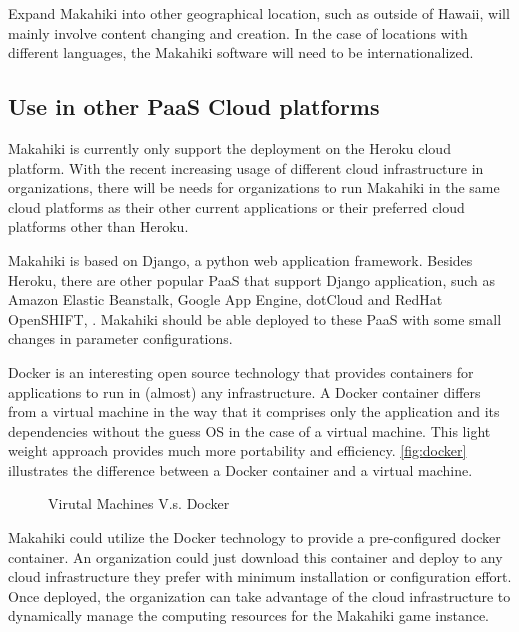 Expand Makahiki into other geographical location, such as outside of Hawaii, will mainly involve content changing and creation. In the case of locations with different languages, the Makahiki software will need to be internationalized. 

\subsection{Use in other PaaS Cloud platforms}
Makahiki is currently only support the deployment on the Heroku cloud platform. With the recent increasing usage of different cloud infrastructure in organizations, there will be needs for organizations to run Makahiki in the same cloud platforms as their other current  applications or their preferred cloud platforms other than Heroku. 

Makahiki is based on Django, a python web application framework. Besides Heroku, there are other popular PaaS that support Django application, such as Amazon Elastic Beanstalk, Google App Engine, dotCloud and RedHat OpenSHIFT, . Makahiki should be able deployed to these PaaS with some small changes in parameter configurations. 

Docker \cite{docker} is an interesting open source technology that provides containers for applications to run in (almost) any infrastructure. A Docker container differs from a virtual machine in the way that it comprises only the application and its dependencies without the guess OS in the case of a virtual machine. This light weight approach provides much more portability and efficiency. \autoref{fig:docker} illustrates the difference between a Docker container and a virtual machine.

\begin{figure}[ht!]
	\centering
		\caption{Virutal Machines V.s. Docker \cite {docker}}
		\label{fig:docker}
\end{figure}

Makahiki could utilize the Docker technology to provide a pre-configured docker container. An organization could just download this container and deploy to any cloud infrastructure they prefer with minimum installation or configuration effort. Once deployed, the organization can take advantage of the cloud infrastructure to dynamically manage the computing resources for the Makahiki game instance.

